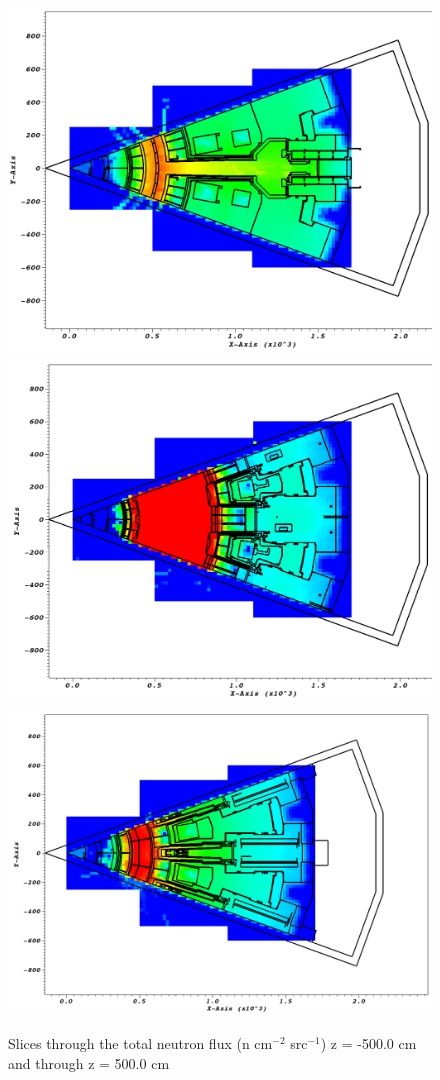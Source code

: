 \documentclass[12pt]{article}
\begin{document}
\begin{figure}[ht!]
  \centering
  \includegraphics[scale=0.27]{../plots/neutron/b4c/flux_z-500.png}
  \includegraphics[scale=0.27]{../plots/neutron/b4c/flux_z0.png}       
  \includegraphics[scale=0.27]{../plots/neutron/b4c/flux_z500.png}
  \caption{Slices through the total neutron flux (n cm$^{-2}$ src$^{-1}$)
           z = -500.0 cm and through z = 500.0 cm}
  \label{fig:wwinp}
\end{figure}
\end{document}
